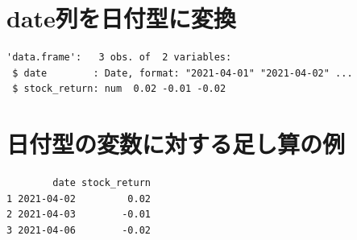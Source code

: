 \documentclass[
  letterpaper,
  DIV=11,
  numbers=noendperiod]{scrreprt}
\newenvironment{Shaded}{\begin{snugshade}}{\end{snugshade}}
\newcommand{\CommentTok}[1]{\textcolor[rgb]{0.37,0.37,0.37}{#1}}
\newcommand{\DecValTok}[1]{\textcolor[rgb]{0.68,0.00,0.00}{#1}}
\newcommand{\DocumentationTok}[1]{\textcolor[rgb]{0.37,0.37,0.37}{\textit{#1}}}
\newcommand{\FunctionTok}[1]{\textcolor[rgb]{0.28,0.35,0.67}{#1}}
\newcommand{\NormalTok}[1]{\textcolor[rgb]{0.00,0.23,0.31}{#1}}
\newcommand{\OtherTok}[1]{\textcolor[rgb]{0.00,0.23,0.31}{#1}}
\newcommand{\SpecialCharTok}[1]{\textcolor[rgb]{0.37,0.37,0.37}{#1}}
\begin{document}
\section{date列を日付型に変換}\label{dateux5217ux3092ux65e5ux4ed8ux578bux306bux5909ux63db}

\begin{Shaded}
\end{Shaded}

\begin{verbatim}
'data.frame':   3 obs. of  2 variables:
 $ date        : Date, format: "2021-04-01" "2021-04-02" ...
 $ stock_return: num  0.02 -0.01 -0.02
\end{verbatim}

\begin{Shaded}
\end{Shaded}

\section{日付型の変数に対する足し算の例}\label{ux65e5ux4ed8ux578bux306eux5909ux6570ux306bux5bfeux3059ux308bux8db3ux3057ux7b97ux306eux4f8b}

\begin{Shaded}
\end{Shaded}

\begin{verbatim}
        date stock_return
1 2021-04-02         0.02
2 2021-04-03        -0.01
3 2021-04-06        -0.02
\end{verbatim}
\end{document}
